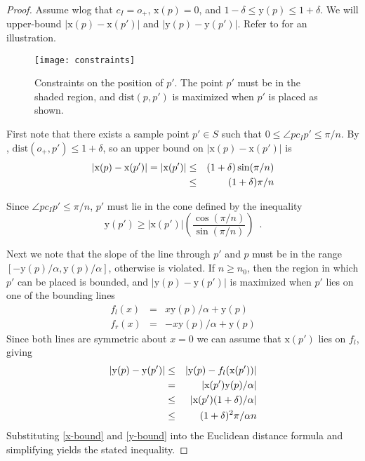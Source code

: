 \documentclass[11pt]{article}
\newcommand{\origin}{o_+}
\newcommand{\dist}{\mathrm{dist}}
\newcommand{\x}{\mathrm{x}}
\newcommand{\y}{\mathrm{y}}
\begin{document}
\begin{proof}
Assume wlog that $c_I=\origin$, $\x(p)=0$, and $1-\delta\le \y(p)\le
1+\delta$.  We will upper-bound $|\x(p)-\x(p')|$ and $|\y(p)-\y(p')|$.
Refer to  for an illustration.

\begin{figure}
\begin{center}\texttt{[image: constraints]}\end{center}
\caption{Constraints on the position of $p'$.  The point $p'$ must be
in the shaded region, and $\dist(p,p')$ is maximized when $p'$ is placed
as shown.}  
\end{figure}

First note that there exists a sample point $p'\in S$ such that $0\le
\angle pc_Ip'\le \pi/n$.  By , $\dist(\origin,p')\le 1+\delta$,
so an upper bound on $|\x(p)-\x(p')|$ is
\begin{eqnarray} 
|\x(p) - \x(p')| = |\x(p')| 
 & \le & (1+\delta)\sin(\pi/n)  \\
 & \le & (1+\delta)\pi/n \eqlabel{x-bound}
\end{eqnarray}

Since $\angle pc_Ip'\le \pi/n$, $p'$ must lie in the cone defined by
the inequality
\begin{equation} 
\y(p') \ge |\x(p')|\left(\frac{\cos(\pi/n)}{\sin(\pi/n)}\right) \enspace . 
\end{equation}


Next we note that the slope of the line through $p'$ and $p$ must be
in the range $[-\y(p)/\alpha,\y(p)/\alpha]$, otherwise  is
violated.  If $n\ge n_0$, then the region in which $p'$ can be placed
is bounded, and $|\y(p)-\y(p')|$ is maximized when $p'$ lies on one of
the bounding lines
\begin{eqnarray}
f_l(x) & = & x\y(p)/\alpha + \y(p) \\
f_r(x) & = & -x\y(p)/\alpha + \y(p)
\end{eqnarray}
Since both lines are symmetric about $x=0$ we can assume that $\x(p')$
lies on $f_l$, giving
\begin{eqnarray}
|\y(p)-\y(p')| 
  & \le & |\y(p)-f_l(\x(p'))|  \\
  & = & |\x(p')\y(p)/\alpha|  \\
  & \le & |\x(p')(1+\delta)/\alpha|  \\
  & \le & (1+\delta)^2\pi/\alpha n \eqlabel{y-bound}
\end{eqnarray}
Substituting \eqref{x-bound} and \eqref{y-bound} into the Euclidean
distance formula and simplifying yields the stated inequality. 
\end{proof}
\end{document}
